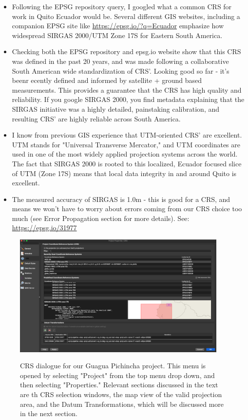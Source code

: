 \documentclass{article}
\begin{document}
\begin{itemize}
    \item Following the EPSG repository query, I googled what a common CRS for work in Quito Ecuador would be. Several different GIS websites, including a companion EPSG site like \url{https://epsg.io/?q=Ecuador} emphasize how widespread SIRGAS 2000/UTM Zone 17S for Eastern South America. 
    \item Checking both the EPSG repository and epsg.io website show that this CRS was defined in the past 20 years, and was made following a collaborative South American wide standardization of CRS'. Looking good so far - it's beenr ecently defined and informed by satellite + ground based measurements. This provides a guarantee that the CRS has high quality and reliability. If you google SIRGAS 2000, you find metadata explaining that the SIRGAS initiative was a highly detailed, painstaking calibration, and resulting CRS' are highly reliable across South America.
    \item I know from previous GIS experience that UTM-oriented CRS' are excellent. UTM stands for "Universal Transverse Mercator," and UTM coordinates are used in one of the most widely applied projection systems across the world. The fact that SIRGAS 2000 is rooted to this localized, Ecuador focused slice of UTM (Zone 17S) means that local data integrity in and around Quito is excellent. 
    \item The measured accuracy of SIRGAS is 1.0m - this is good for a CRS, and means we won't have to worry about errors coming from our CRS choice too much (see Error Propagation section for more details). See: \url{https://epsg.io/31977}
\end{itemize}

\begin{figure}[htbp]
    \centering
    \includegraphics[width=0.95\textwidth]{FIg_16_proj_crs.png}
    \label{fig13}
    \caption{CRS dialogue for our Guagua Pichincha project. This menu is opened by selecting "Project" from the top menu drop down, and then selecting "Properties." Relevant sections discussed in the text are th CRS selection windows, the map view of the valid projection area, and the Datum Transformations, which will be discussed more in the next section.}
\end{figure}
\end{document}
